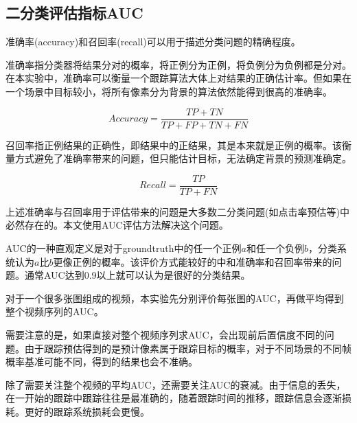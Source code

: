 \subsection{二分类评估指标AUC} \label{section:auc}
准确率(accuracy)和召回率(recall)可以用于描述分类问题的精确程度。
\par
准确率指分类器将结果分对的概率，将正例分为正例，将负例分为负例都是分对。在本实验中，准确率可以衡量一个跟踪算法大体上对结果的正确估计率。但如果在一个场景中目标较小，将所有像素分为背景的算法依然能得到很高的准确率。
\par
\begin{equation}\label{equ:accuracy}  Accuracy=\frac{TP+TN}{TP+FP+TN+FN}  \end{equation}
\par
召回率指正例结果的正确性，即结果中的正结果，其是本来就是正例的概率。该衡量方式避免了准确率带来的问题，但只能估计目标，无法确定背景的预测准确定。
\par
\begin{equation}\label{equ:recall}  Recall=\frac{TP}{TP+FN}  \end{equation}
\par
上述准确率与召回率用于评估带来的问题是大多数二分类问题(如点击率预估等)中必然存在的。本文使用AUC评估方法解决这个问题。
\par
AUC的一种直观定义是对于groundtruth中的任一个正例$a$和任一个负例$b$，分类系统认为$a$比$b$更像正例的概率。该评价方式能较好的中和准确率和召回率带来的问题。通常AUC达到0.9以上就可以认为是很好的分类结果。
\par
对于一个很多张图组成的视频，本实验先分别评价每张图的AUC，再做平均得到整个视频序列的AUC。
\par
需要注意的是，如果直接对整个视频序列求AUC，会出现前后置信度不同的问题。由于跟踪预估得到的是预计像素属于跟踪目标的概率，对于不同场景的不同帧概率基准可能不同，得到的结果也会不准确。
\par
除了需要关注整个视频的平均AUC，还需要关注AUC的衰减。由于信息的丢失，在一开始的跟踪中跟踪往往是最准确的，随着跟踪时间的推移，跟踪信息会逐渐损耗。更好的跟踪系统损耗会更慢。


